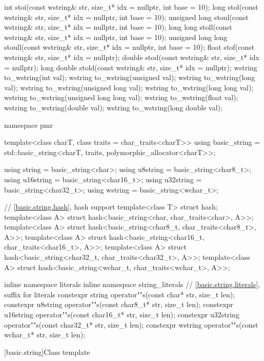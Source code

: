 \begin{codeblock}
{  int stoi(const wstring& str, size_t* idx = nullptr, int base = 10);
  long stol(const wstring& str, size_t* idx = nullptr, int base = 10);
  unsigned long stoul(const wstring& str, size_t* idx = nullptr, int base = 10);
  long long stoll(const wstring& str, size_t* idx = nullptr, int base = 10);
  unsigned long long stoull(const wstring& str, size_t* idx = nullptr, int base = 10);
  float stof(const wstring& str, size_t* idx = nullptr);
  double stod(const wstring& str, size_t* idx = nullptr);
  long double stold(const wstring& str, size_t* idx = nullptr);
  wstring to_wstring(int val);
  wstring to_wstring(unsigned val);
  wstring to_wstring(long val);
  wstring to_wstring(unsigned long val);
  wstring to_wstring(long long val);
  wstring to_wstring(unsigned long long val);
  wstring to_wstring(float val);
  wstring to_wstring(double val);
  wstring to_wstring(long double val);

  namespace pmr {
    template<class charT, class traits = char_traits<charT>>
      using basic_string = std::basic_string<charT, traits, polymorphic_allocator<charT>>;

    using string    = basic_string<char>;
    using u8string  = basic_string<char8_t>;
    using u16string = basic_string<char16_t>;
    using u32string = basic_string<char32_t>;
    using wstring   = basic_string<wchar_t>;
  }

  // \ref{basic.string.hash}, hash support
  template<class T> struct hash;
  template<class A> struct hash<basic_string<char, char_traits<char>, A>>;
  template<class A> struct hash<basic_string<char8_t, char_traits<char8_t>, A>>;
  template<class A> struct hash<basic_string<char16_t, char_traits<char16_t>, A>>;
  template<class A> struct hash<basic_string<char32_t, char_traits<char32_t>, A>>;
  template<class A> struct hash<basic_string<wchar_t, char_traits<wchar_t>, A>>;

  inline namespace literals {
    inline namespace string_literals {
      // \ref{basic.string.literals}, suffix for  literals
      constexpr string    operator""s(const char* str, size_t len);
      constexpr u8string  operator""s(const char8_t* str, size_t len);
      constexpr u16string operator""s(const char16_t* str, size_t len);
      constexpr u32string operator""s(const char32_t* str, size_t len);
      constexpr wstring   operator""s(const wchar_t* str, size_t len);
    }
  }
}
\end{codeblock}

[basic.string]{Class template }

